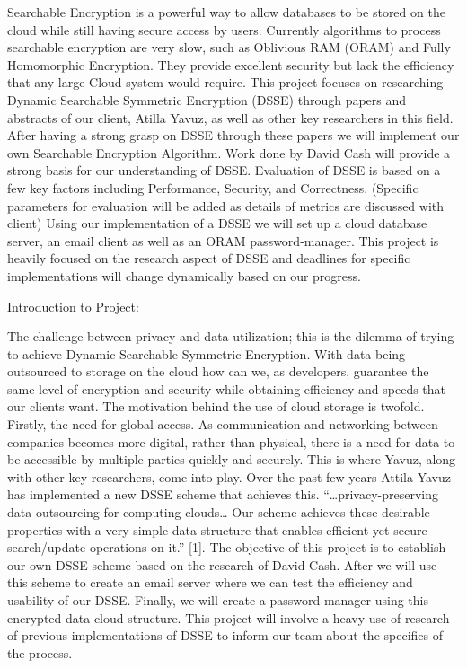 \documentclass[10pt]{letter} %
\begin{document}
\begin{letter}
Searchable Encryption is a powerful way to allow databases to be stored on the cloud while still having secure access by users. Currently algorithms to process searchable encryption are very slow, such as Oblivious RAM (ORAM) and Fully Homomorphic Encryption. They provide excellent security but lack the efficiency that any large Cloud system would require. This project focuses on researching Dynamic Searchable Symmetric Encryption (DSSE) through papers and abstracts of our client, Atilla Yavuz, as well as other key researchers in this field. After having a strong grasp on DSSE through these papers we will implement our own Searchable Encryption Algorithm. Work done by David Cash will provide a strong basis for our understanding of DSSE. Evaluation of DSSE is based on a few key factors including Performance, Security, and Correctness. (Specific parameters for evaluation will be added as details of metrics are discussed with client) Using our implementation of a DSSE we will set up a cloud database server, an email client as well as an ORAM password-manager. This project is heavily focused on the research aspect of DSSE and deadlines for specific implementations will change dynamically based on our progress.


Introduction to Project: 

The challenge between privacy and data utilization; this is the dilemma of trying to achieve Dynamic Searchable Symmetric Encryption. With data being outsourced to storage on the cloud how can we, as developers, guarantee the same level of encryption and security while obtaining efficiency and speeds that our clients want. The motivation behind the use of cloud storage is twofold. Firstly, the need for global access. As communication and networking between companies becomes more digital, rather than physical, there is a need for data to be accessible by multiple parties quickly and securely. This is where Yavuz, along with other key researchers, come into play. Over the past few years Attila Yavuz has implemented a new DSSE scheme that achieves this. “…privacy-preserving data outsourcing for computing clouds… Our scheme achieves these desirable properties with a very simple data structure that enables efficient yet secure search/update operations on it.” [1].
The objective of this project is to establish our own DSSE scheme based on the research of David Cash. After we will use this scheme to create an email server where we can test the efficiency and usability of our DSSE. Finally, we will create a password manager using this encrypted data cloud structure. This project will involve a heavy use of research of previous implementations of DSSE to inform our team about the specifics of the process.


\end{letter}
\end{document}
